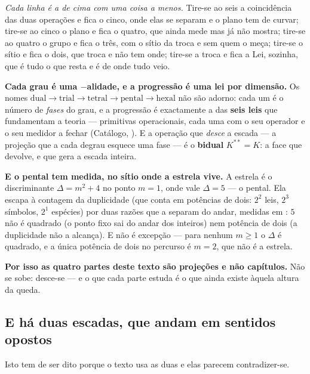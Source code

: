 \documentclass[livro.tex]{subfiles}
\begin{document}
\noindent \emph{Cada linha é a de cima com uma coisa a menos.} Tire-se ao seis a coincidência das
duas operações e fica o cinco, onde elas se separam e o plano tem de curvar; tire-se ao cinco o
plano e fica o quatro, que ainda mede mas já não mostra; tire-se ao quatro o grupo e fica o três,
com o sítio da troca e sem quem o meça; tire-se o sítio e fica o dois, que troca e não tem onde;
tire-se a troca e fica a Lei, sozinha, que é tudo o que resta e é de onde tudo veio.

\medskip
\noindent \textbf{Cada grau é uma $-$alidade, e a progressão é uma lei por dimensão.} Os nomes
$\text{dual}\to\text{trial}\to\text{tetral}\to\text{pental}\to\text{hexal}$ não são adorno: cada um é o
número de \emph{fases} do grau, e a progressão é exactamente a das \textbf{seis leis} que fundamentam a
teoria --- primitivas operacionais, cada uma com o seu operador e o seu medidor a fechar (Catálogo,
). E a operação que \emph{desce} a escada --- a projeção que a cada degrau esquece
uma fase --- é o \textbf{bidual} $K^{**}=K$: a face que devolve, e que gera a escada inteira.

\medskip
\noindent \textbf{E o pental tem medida, no sítio onde a estrela vive.} A estrela é o
discriminante $\Delta=m^2+4$ no ponto $m=1$, onde vale $\Delta=5$ --- o pental. Ela escapa à
contagem da duplicidade (que conta em potências de dois: $2^2$ leis, $2^3$ símbolos, $2^1$
espécies) por duas razões que a separam do andar, medidas em : $5$ não é
quadrado (o ponto fixo sai do andar dos inteiros) nem potência de dois (a duplicidade não a
alcança). E não é excepção --- para nenhum $m\ge1$ o $\Delta$ é quadrado, e a única potência de
dois no percurso é $m=2$, que não é a estrela.

\medskip
\noindent \textbf{Por isso as quatro partes deste texto são projeções e não capítulos.} Não se
sobe: desce-se --- e o que cada parte estuda é o que ainda existe àquela altura da queda.

\subsection{E há duas escadas, que andam em sentidos opostos}\label{sec:duasescadas}

\noindent Isto tem de ser dito porque o texto usa as duas e elas parecem contradizer-se.
\end{document}
